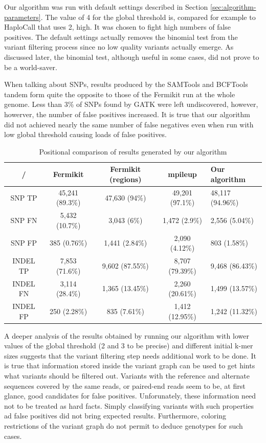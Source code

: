 Our algorithm was run with default settings described in Section \ref{sec:algorithm-parameters}. The value of 4 for the global threshold is, compared for example to HaploCall that uses 2, high. It was chosen to fight high numbers of false positives. The default settings actually removes the binomial test from the variant filtering process since no low quality variants actually emerge. As discussed later, the binomial test, although useful in some cases, did not prove to be a world-saver.

When talking about SNPs, results produced by the SAMTools and BCFTools tandem form quite the opposite to those of the Fermikit run at the whole genome. Less than 3\% of SNPs found by GATK were left undiscovered, however, howerver, the number of false positives increased. It is true that our algorithm did not achieved nearly the same number of false negatives even when run with low global threshold causing loads of false positives.

\begin{table}
\begin{center}
\caption{Positional comparison of results generated by our algorithm}
\label{tab:positional-results}
\begin{tabular}{| c | c | c | c | p{3cm} |}
\hline
/ & Fermikit & Fermikit (regions) & mpileup & Our algorithm \\
\hline
SNP TP & 45,241 (89.3\%) & 47,630 (94\%) & 49,201 (97.1\%) & 48,117 (94.96\%) \\
\hline
SNP FN & 5,432 (10.7\%) & 3,043 (6\%) & 1,472 (2.9\%) & 2,556 (5.04\%) \\
\hline
SNP FP & 385 (0.76\%) & 1,441 (2.84\%) & 2,090 (4.12\%) & 803 (1.58\%) \\
\hline
INDEL TP & 7,853 (71.6\%) & 9,602 (87.55\%) & 8,707 (79.39\%) & 9,468 (86.43\%) \\
\hline
INDEL FN & 3,114 (28.4\%) & 1,365 (13.45\%) & 2,260 (20.61\%) & 1,499 (13.57\%) \\
\hline
INDEL FP & 250 (2.28\%) & 835 (7.61\%) & 1,412 (12.95\%) & 1,242 (11.32\%) \\
\hline
\end{tabular}
\end{center}
\end{table}

A deeper analysis of the results obtained by running our algorithm with lower values of the global threshold (2 and 3 to be precise) and different initial k-mer sizes suggests that the variant filtering step needs additional work to be done. It is true that information stored inside the variant graph can be used to get hints what variants should be filtered out. Variants with the reference and alternate sequences covered by the same reads, or paired-end reads seem to be, at first glance, good candidates for false positives. Unforunately, these information need not to be treated as hard facts. Simply classifying variants with such properties ad false positives did not bring expected results. Furthermore, coloring restrictions of the variant graph do not permit to deduce genotypes for such cases.


